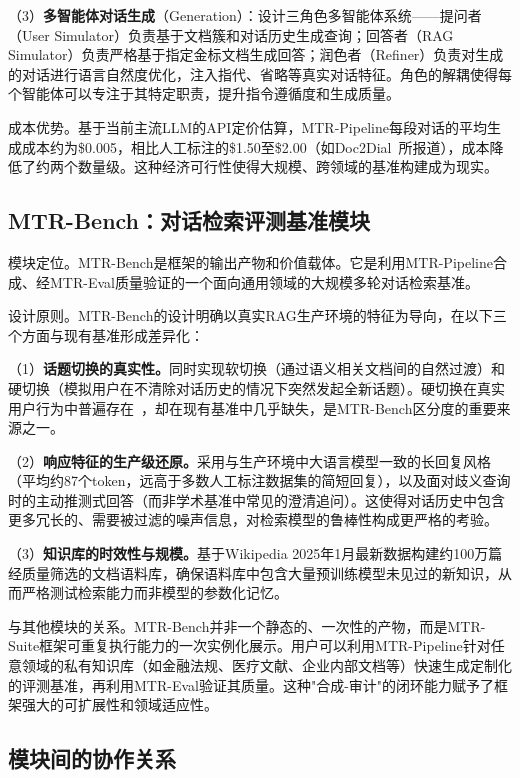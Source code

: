 （3）\textbf{多智能体对话生成}（Generation）：设计三角色多智能体系统——提问者（User Simulator）负责基于文档簇和对话历史生成查询；回答者（RAG Simulator）负责严格基于指定金标文档生成回答；润色者（Refiner）负责对生成的对话进行语言自然度优化，注入指代、省略等真实对话特征。角色的解耦使得每个智能体可以专注于其特定职责，提升指令遵循度和生成质量。


成本优势。基于当前主流LLM的API定价估算，MTR-Pipeline每段对话的平均生成成本约为\$0.005，相比人工标注的\$1.50至\$2.00（如Doc2Dial~\citep{feng-etal-2020-doc2dial}所报道），成本降低了约两个数量级。这种经济可行性使得大规模、跨领域的基准构建成为现实。

\subsection{MTR-Bench：对话检索评测基准模块}

模块定位。MTR-Bench是框架的输出产物和价值载体。它是利用MTR-Pipeline合成、经MTR-Eval质量验证的一个面向通用领域的大规模多轮对话检索基准。

设计原则。MTR-Bench的设计明确以真实RAG生产环境的特征为导向，在以下三个方面与现有基准形成差异化：

（1）\textbf{话题切换的真实性。}同时实现软切换（通过语义相关文档间的自然过渡）和硬切换（模拟用户在不清除对话历史的情况下突然发起全新话题）。硬切换在真实用户行为中普遍存在~\citep{spink2002multitasking}，却在现有基准中几乎缺失，是MTR-Bench区分度的重要来源之一。
    
（2）\textbf{响应特征的生产级还原。}采用与生产环境中大语言模型一致的长回复风格（平均约87个token，远高于多数人工标注数据集的简短回复），以及面对歧义查询时的主动推测式回答（而非学术基准中常见的澄清追问）。这使得对话历史中包含更多冗长的、需要被过滤的噪声信息，对检索模型的鲁棒性构成更严格的考验。
    
（3）\textbf{知识库的时效性与规模。}基于Wikipedia 2025年1月最新数据构建约100万篇经质量筛选的文档语料库，确保语料库中包含大量预训练模型未见过的新知识，从而严格测试检索能力而非模型的参数化记忆。


与其他模块的关系。MTR-Bench并非一个静态的、一次性的产物，而是MTR-Suite框架可重复执行能力的一次实例化展示。用户可以利用MTR-Pipeline针对任意领域的私有知识库（如金融法规、医疗文献、企业内部文档等）快速生成定制化的评测基准，再利用MTR-Eval验证其质量。这种"合成-审计"的闭环能力赋予了框架强大的可扩展性和领域适应性。

\subsection{模块间的协作关系}

